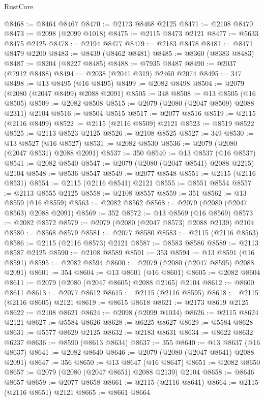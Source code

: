 \begin{lexlean}{RustCore}
\begin{coremodule}
@8468 := @8464 @8467
@8470 := @2173 @8468 @2125
@8471 := @2108 @8470
@8473 := @2098 (@2099 @1018)
@8475 := @2115 @8473 @2121
@8477 := @5633 @8475 @2125
@8478 := @2194 @8477
@8479 := @2183 @8478
@8481 := @8471 @8479 @2200
@8483 := @8439 (@8462 @8481)
@8485 := @8360 (@8383 @8483)
@8487 := @8204 (@8227 @8485)
@8488 := @7935 @8487
@8490 := @2037 (@7912 @8488)
@8494 := @2038 (@2041 @319) @2460 @2074
@8495 := 347
@8498 := @13 @8495 (@16 @8495)
@8499 := @2082 @8498
@8504 := @2079 (@2080 (@2047 @8499) @2088 @2091)
@8505 := 348
@8508 := @13 @8505 (@16 @8505)
@8509 := @2082 @8508
@8515 := @2079 (@2080 (@2047 @8509) @2088 @2311) @2104
@8516 := @8504 @8515
@8517 := @2077 @8516
@8519 := @2115 (@2116 @8499)
@8522 := @2115 (@2116 @8509) @2121
@8523 := @8519 @8522
@8525 := @2113 @8523 @2125
@8526 := @2108 @8525
@8527 := 349
@8530 := @13 @8527 (@16 @8527)
@8531 := @2082 @8530
@8536 := @2079 (@2080 (@2047 @8531) @2088 @2091)
@8537 := 350
@8540 := @13 @8537 (@16 @8537)
@8541 := @2082 @8540
@8547 := @2079 (@2080 (@2047 @8541) @2088 @2215) @2104
@8548 := @8536 @8547
@8549 := @2077 @8548
@8551 := @2115 (@2116 @8531)
@8554 := @2115 (@2116 @8541) @2121
@8555 := @8551 @8554
@8557 := @2113 @8555 @2125
@8558 := @2108 @8557
@8559 := 351
@8562 := @13 @8559 (@16 @8559)
@8563 := @2082 @8562
@8568 := @2079 (@2080 (@2047 @8563) @2088 @2091)
@8569 := 352
@8572 := @13 @8569 (@16 @8569)
@8573 := @2082 @8572
@8579 := @2079 (@2080 (@2047 @8573) @2088 @2139) @2104
@8580 := @8568 @8579
@8581 := @2077 @8580
@8583 := @2115 (@2116 @8563)
@8586 := @2115 (@2116 @8573) @2121
@8587 := @8583 @8586
@8589 := @2113 @8587 @2125
@8590 := @2108 @8589
@8591 := 353
@8594 := @13 @8591 (@16 @8591)
@8595 := @2082 @8594
@8600 := @2079 (@2080 (@2047 @8595) @2088 @2091)
@8601 := 354
@8604 := @13 @8601 (@16 @8601)
@8605 := @2082 @8604
@8611 := @2079 (@2080 (@2047 @8605) @2088 @2165) @2104
@8612 := @8600 @8611
@8613 := @2077 @8612
@8615 := @2115 (@2116 @8595)
@8618 := @2115 (@2116 @8605) @2121
@8619 := @8615 @8618
@8621 := @2173 @8619 @2125
@8622 := @2108 @8621
@8624 := @2098 (@2099 @1034)
@8626 := @2115 @8624 @2121
@8627 := @5584 @8626
@8628 := @6225 @8627
@8629 := @5584 @8628
@8631 := @5577 @8629 @2125
@8632 := @2183 @8631
@8634 := @8622 @8632 @6237
@8636 := @8590 (@8613 @8634)
@8637 := 355
@8640 := @13 @8637 (@16 @8637)
@8641 := @2082 @8640
@8646 := @2079 (@2080 (@2047 @8641) @2088 @2091)
@8647 := 356
@8650 := @13 @8647 (@16 @8647)
@8651 := @2082 @8650
@8657 := @2079 (@2080 (@2047 @8651) @2088 @2139) @2104
@8658 := @8646 @8657
@8659 := @2077 @8658
@8661 := @2115 (@2116 @8641)
@8664 := @2115 (@2116 @8651) @2121
@8665 := @8661 @8664

\end{coremodule}
\end{lexlean}
